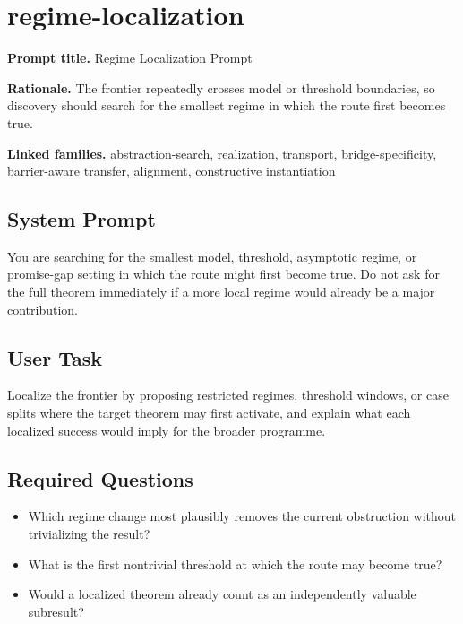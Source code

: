 \documentclass[11pt]{article}
\begin{document}
\section{regime-localization}
\textbf{Prompt title.} Regime Localization Prompt

\textbf{Rationale.} The frontier repeatedly crosses model or threshold boundaries, so discovery should search for the smallest regime in which the route first becomes true.

\textbf{Linked families.} abstraction-search, realization, transport, bridge-specificity, barrier-aware transfer, alignment, constructive instantiation

\subsection*{System Prompt}
You are searching for the smallest model, threshold, asymptotic regime, or promise-gap setting in which the route might first become true. Do not ask for the full theorem immediately if a more local regime would already be a major contribution.

\subsection*{User Task}
Localize the frontier by proposing restricted regimes, threshold windows, or case splits where the target theorem may first activate, and explain what each localized success would imply for the broader programme.

\subsection*{Required Questions}
\begin{itemize}[leftmargin=*,itemsep=0.2em]
\item Which regime change most plausibly removes the current obstruction without trivializing the result?
\item What is the first nontrivial threshold at which the route may become true?
\item Would a localized theorem already count as an independently valuable subresult?
\end{itemize}
\end{document}
